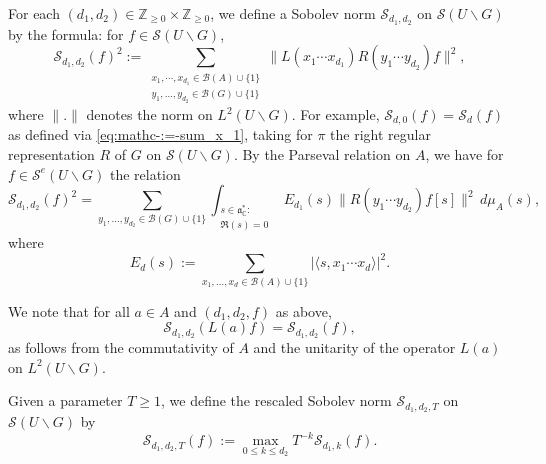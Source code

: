 \documentclass[reqno]{amsart}
\theoremstyle{plain} \newtheorem{theorem} {Theorem}
\theoremstyle{definition} \newtheorem{definition} [theorem] {Definition}
\theoremstyle{itplain} %
\numberwithin{equation}{section}
\numberwithin{theorem}{section}
\renewcommand{\geq}{\geqslant}
\renewcommand{\leq}{\leqslant}
\begin{document}
For each $(d_1,d_2) \in \mathbb{Z}_{\geq 0} \times \mathbb{Z}_{\geq 0}$, we define a Sobolev norm $\mathcal{S}_{d_1,d_2}$ on $\mathcal{S}(U \backslash G)$ by the formula: for $f \in \mathcal{S}(U \backslash G)$,  
\begin{equation*}
  \mathcal{S}_{d_1,d_2}(f)^2 :=
  \sum _{
    \substack{
      x_1, \dotsb, x_{d_1} \in \mathcal{B}(A) \cup \{1\}  \\
       y_1, \dotsc, y _{d _2 } \in \mathcal{B}(G) \cup \{1\}
    }
  }
  \| L(x_1 \dotsb x_{d_1}) R(y_1 \dotsb y_{d_2}) f \|^2,
\end{equation*}
where $\|.\|$ denotes the norm on $L^2(U \backslash G)$.  For example, $\mathcal{S}_{d,0}(f) = \mathcal{S}_{d}(f)$ as defined via \eqref{eq:mathc-:=-sum_x_1}, taking for $\pi$ the right regular representation $R$ of $G$ on $\mathcal{S}(U \backslash G)$.  By the Parseval relation on $A$, we have for $f \in \mathcal{S}^e(U \backslash G)$ the relation
\begin{equation}\label{eq:sobolev-parseval-A-U-G}
  \mathcal{S}_{d_1,d_2}(f)^2 =
  \sum _{
    y_1, \dotsc, y _{d _2 } \in \mathcal{B}(G) \cup \{1\}
  }
  \int _{
    \substack{
      s \in \mathfrak{a}_{\mathbb{C}}^* :  \\
       \Re(s) = 0
    }
  }
  E_{d_1}(s)
  \| R(y_1 \dotsb y_{d_2}) f[s] \|^2 \, d \mu_A(s),
\end{equation}
where
\begin{equation}\label{eq:e_ds-:=-sum}
  E_d(s) :=
  \sum _{
    x_1, \dotsc, x _{d } \in \mathcal{B}(A) \cup \{1\}
  }
  |\langle s, x_1 \dotsb x_{d}  \rangle|^2.
\end{equation}

We note that for all $a \in A$ and $(d_1,d_2,f)$ as above,
\begin{equation}\label{eq:mathcals_d_1-d_2la-f}
  \mathcal{S}_{d_1,d_2}(L(a) f) = \mathcal{S}_{d_1,d_2}(f),
\end{equation}
as follows from the commutativity of $A$ and the unitarity of the operator $L(a)$ on $L^2(U \backslash G)$.


Given a parameter $T \geq 1$, we define the rescaled Sobolev norm $\mathcal{S}_{d_1,d_2,T}$ on $\mathcal{S}(U \backslash G)$ by 
\begin{equation}\label{eq:mathcals_d_1-d_2-tf}
  \mathcal{S}_{d_1,d_2,T}(f) :=
  \max_{0 \leq k \leq d_2}
  T^{-k}
  \mathcal{S}_{d_1,k}(f).
\end{equation}
\end{document}
